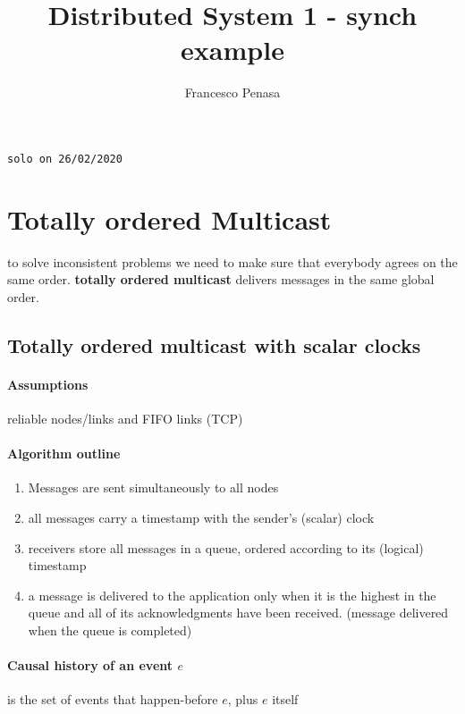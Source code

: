 \documentclass[11pt]{article}
\begin{document}
\author{Francesco Penasa}
\title{Distributed System 1 - synch example}
\maketitle

\medskip

\texttt{solo on 26/02/2020}
\section{Totally ordered Multicast} %
\label{sec:totally_ordered_multicast}
to solve inconsistent problems we need to make sure that everybody agrees on the same order.
\textbf{totally ordered multicast} delivers messages in the same global order.

\subsection{Totally ordered multicast with scalar clocks} %
\label{sub:totally_ordered_multicast_with_scalar_clocks}
\paragraph{Assumptions} %
\label{par:assumptions}
reliable nodes/links and FIFO links (TCP)
\paragraph{Algorithm outline} %
\label{par:algorithm_outline}
\begin{enumerate}
	\item Messages are sent simultaneously to all nodes
	\item all messages carry a timestamp with the sender's (scalar) clock
	\item receivers store all messages in a queue, ordered according to its (logical) timestamp
	\item a message is delivered to the application only when it is the highest in the queue and all of its acknowledgments have been received. (message delivered when the queue is completed)
\end{enumerate}

\paragraph{Causal history of an event $e$} %
\label{par:causal_history_}
  is the set of events that happen-before $e$, plus $e$ itself
\end{document}

